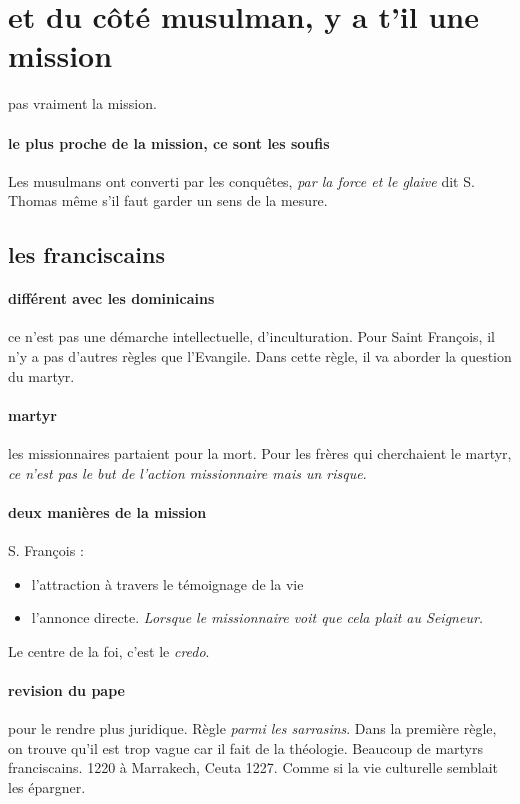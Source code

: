 \section{et du côté musulman, y a t'il une mission}

\begin{Def}[darwa]
pas vraiment la mission.
\end{Def}

\paragraph{le plus proche de la mission, ce sont les soufis} Les musulmans ont converti par les conquêtes, \textit{par la force et le glaive} dit S. Thomas même s'il faut garder un sens de la mesure.

\subsection{les franciscains}

\paragraph{différent avec les dominicains} ce n'est pas une démarche intellectuelle, d'inculturation.
Pour Saint François, il n'y a pas d'autres règles que l'Evangile. Dans cette règle, il va aborder la question du martyr.

\paragraph{martyr} les missionnaires partaient pour la mort. Pour les frères qui cherchaient le martyr, \textit{ce n'est pas le but de l'action missionnaire mais un risque}.

\paragraph{deux manières de la mission} S. François :
\begin{itemize}
    \item l'attraction à travers le témoignage de la vie
    \item l'annonce directe. \textit{Lorsque le missionnaire voit que cela plait au Seigneur.}
\end{itemize}

Le centre de la foi, c'est le \textit{credo}.

\paragraph{revision du pape} pour le rendre plus juridique. Règle \textit{parmi les sarrasins}.
Dans la première règle, on trouve qu'il est trop vague car il fait de la théologie. Beaucoup de martyrs franciscains. 1220 à Marrakech, Ceuta 1227. Comme si la vie culturelle semblait les épargner.

